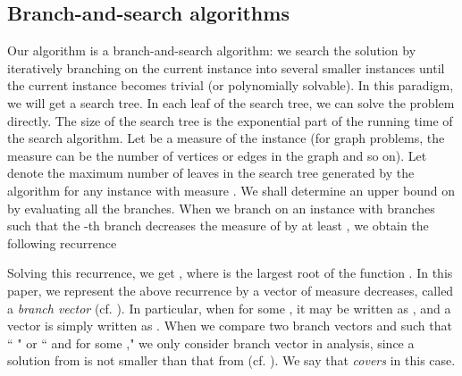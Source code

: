 \documentclass[runningheads]{llncs}
\begin{document}

\subsection{Branch-and-search algorithms}
Our algorithm is a branch-and-search algorithm: we search the solution by iteratively branching on the current
instance into several smaller instances until the current instance becomes trivial (or polynomially solvable).
In this paradigm, we will get a search tree. In each leaf of the search tree, we can solve the problem directly.
The size of the search tree is the exponential part of the running time of the search algorithm.
Let  be a measure of the instance (for graph problems, the measure can be the number of vertices or edges in the graph and so on). Let  denote the maximum number of leaves in the search tree
generated by the algorithm for any instance with measure .
We shall determine an upper bound on  by evaluating all the branches.
When we branch on an instance  with  branches such that
the -th branch decreases the measure  of  by
at least , we obtain the following recurrence

Solving this recurrence, we get , where  is the largest
root of the function .
In this paper, we represent the above recurrence by a vector
 of measure decreases, called a {\em branch vector}
(cf. \cite{Fomin:book}).
In particular, when  for some ,
it may be written as
,
and a vector  is simply written as .
When we compare two branch vectors  
and  such that `` " or `` and
 for some ,"
we only consider branch vector  in analysis,
since a solution  from   is not
smaller than that from  (cf. \cite{Fomin:book}).
We say that   {\em covers}  in this case.
\end{document}
